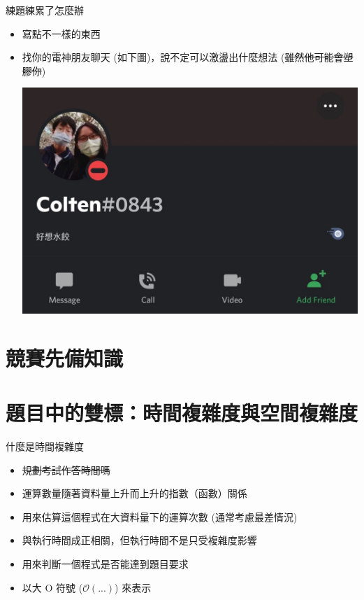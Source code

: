 \documentclass[aspectratio=169]{beamer}
\begin{document}
	\begin{frame}{練題練累了怎麼辦}
		\begin{itemize}
			\item<1-> 寫點不一樣的東西
			\item<2-> 找你的電神朋友聊天 (如下圖)，說不定可以激盪出什麼想法 (\sout{雖然他可能會塑膠你})
			\begin{center}
				\includegraphics[height=0.5\textheight]{./src/Corzlten.png}
			\end{center}
		\end{itemize}
		
	\end{frame}

	\section{競賽先備知識}

	\section{題目中的雙標：時間複雜度與空間複雜度}

	\begin{frame}{什麼是時間複雜度}
		\begin{itemize}
			\item<1-> \sout{規劃考試作答時間嗎}
			\item<2-> 運算數量隨著資料量上升而上升的指數（函數）關係
			\item<3-> 用來估算這個程式在大資料量下的運算次數 (通常考慮最差情況)
			\item<4-> 與執行時間成正相關，但執行時間不是只受複雜度影響
			\item<5-> 用來判斷一個程式是否能達到題目要求
			\item<6-> 以大 O 符號 ($\mathcal{O(...)}$) 來表示
		\end{itemize}
	\end{frame}
\end{document}

